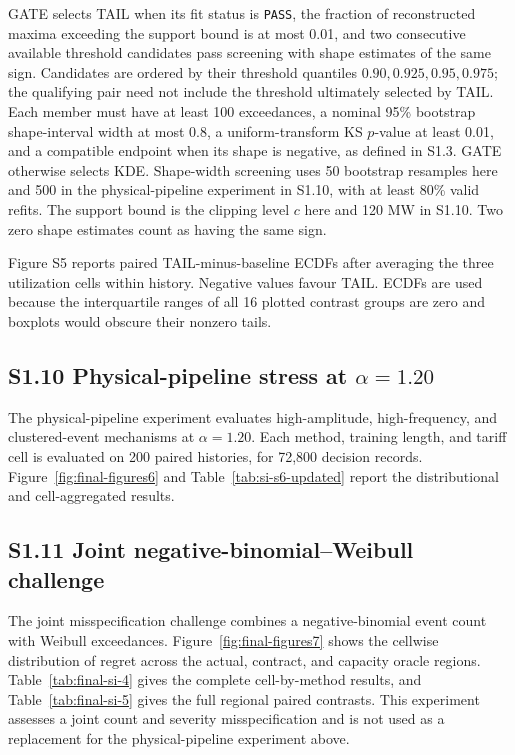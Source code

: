 \documentclass[AMA,Times1COL]{WileyNJDv5}
\begin{document}
GATE selects TAIL when its fit status is \texttt{PASS}, the fraction
of reconstructed maxima exceeding the support bound is at most 0.01,
and two consecutive available threshold candidates pass screening
with shape estimates of the same sign. Candidates are ordered by
their threshold quantiles \(0.90,0.925,0.95,0.975\); the qualifying
pair need not include the threshold ultimately selected by TAIL.
Each member must have at least 100 exceedances, a nominal 95\%
bootstrap shape-interval width at most 0.8, a uniform-transform KS
\(p\)-value at least 0.01, and a compatible endpoint when its shape
is negative, as defined in S1.3. GATE otherwise selects KDE.
Shape-width screening uses 50 bootstrap resamples here and 500 in
the physical-pipeline experiment in S1.10, with at least 80\% valid refits.
The support bound is the clipping level \(c\) here and 120 MW in
S1.10. Two zero shape estimates count as having the same sign.

Figure S5 reports paired TAIL-minus-baseline ECDFs after averaging the
three utilization cells within history. Negative values favour TAIL.
ECDFs are used because the interquartile ranges of all 16 plotted
contrast groups are zero and boxplots would obscure their nonzero
tails.

\FloatBarrier




\subsection*{S1.10 Physical-pipeline stress at $\alpha=1.20$}

The physical-pipeline experiment evaluates high-amplitude,
high-frequency, and clustered-event mechanisms at $\alpha=1.20$. Each
method, training length, and tariff cell is evaluated on 200 paired
histories, for 72,800 decision records. Figure~\ref{fig:final-figures6}
and Table~\ref{tab:si-s6-updated} report the distributional and
cell-aggregated results.

\subsection*{S1.11 Joint negative-binomial--Weibull challenge}

The joint misspecification challenge combines a negative-binomial event
count with Weibull exceedances. Figure~\ref{fig:final-figures7} shows the
cellwise distribution of regret across the actual, contract, and
capacity oracle regions. Table~\ref{tab:final-si-4} gives the complete
cell-by-method results, and Table~\ref{tab:final-si-5} gives the full
regional paired contrasts. This experiment assesses a joint count and
severity misspecification and is not used as a replacement for the
physical-pipeline experiment above.
\end{document}
